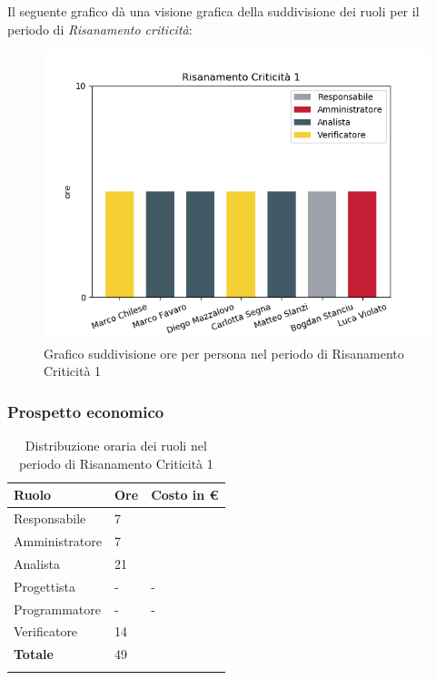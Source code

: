 Il seguente grafico dà una visione grafica della suddivisione dei ruoli per il periodo di \textit{Risanamento criticità}:
\begin{figure}[H]
  \centering
  \includegraphics[width=1\linewidth]{./images/fig_rc1.png}
  \caption{Grafico suddivisione ore per persona nel periodo di Risanamento Criticità 1}
  \label{fig:grafico suddivione ruoli rc1}
\end{figure}

\subsubsection{Prospetto economico}
\begin{longtable}{| C{.30\textwidth}| C{.15\textwidth}| C{.20\textwidth}|}
\hline
\textbf{Ruolo} & \textbf{Ore} & \textbf{Costo in \euro} \\
\hline 
Responsabile & 7 &  \\
\hline
Amministratore & 7 &  \\
\hline
Analista & 21 &  \\
\hline
Progettista & - & - \\
\hline
Programmatore & - & - \\
\hline
Verificatore & 14 & \\
\hline
\textbf{Totale} & 49 &  \\
\hline


\caption{Distribuzione oraria dei ruoli nel periodo di Risanamento Criticità 1}
\label{Distribuzione oraria del periodo di rc1}
\end{longtable}

